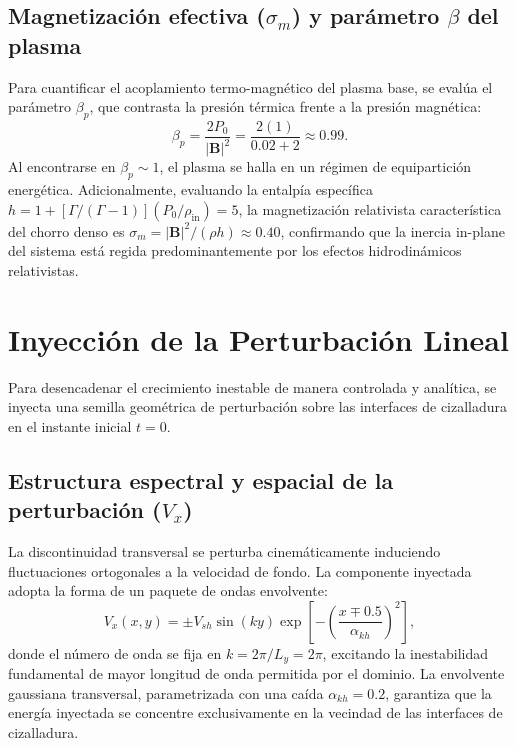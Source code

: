 \subsection{Magnetización efectiva ($\sigma_m$) y parámetro $\beta$ del plasma}

\primerparrafo Para cuantificar el acoplamiento termo-magnético del plasma base, se evalúa el parámetro $\beta_p$, que contrasta la presión térmica frente a la presión magnética:
\begin{equation}
    \beta_p = \frac{2 P_0}{|\mathbf{B}|^2} = \frac{2(1)}{0.02 + 2} \approx 0.99.
\end{equation}
Al encontrarse en $\beta_p \sim 1$, el plasma se halla en un régimen de equipartición energética. Adicionalmente, evaluando la entalpía específica $h = 1 + [\Gamma/(\Gamma-1)](P_0/\rho_{\text{in}}) = 5$, la magnetización relativista característica del chorro denso es $\sigma_m = |\mathbf{B}|^2 / (\rho h) \approx 0.40$, confirmando que la inercia in-plane del sistema está regida predominantemente por los efectos hidrodinámicos relativistas.

\section{Inyección de la Perturbación Lineal}

\primerparrafo Para desencadenar el crecimiento inestable de manera controlada y analítica, se inyecta una semilla geométrica de perturbación sobre las interfaces de cizalladura en el instante inicial $t=0$.

\subsection{Estructura espectral y espacial de la perturbación ($V_x$)}

\primerparrafo La discontinuidad transversal se perturba cinemáticamente induciendo fluctuaciones ortogonales a la velocidad de fondo. La componente inyectada adopta la forma de un paquete de ondas envolvente:
\begin{equation}
    V_x(x,y) = \pm V_{sh} \sin(k y) \exp\left[-\left(\frac{x \mp 0.5}{\alpha_{kh}}\right)^2\right],
\end{equation}
donde el número de onda se fija en $k = 2\pi/L_y = 2\pi$, excitando la inestabilidad fundamental de mayor longitud de onda permitida por el dominio. La envolvente gaussiana transversal, parametrizada con una caída $\alpha_{kh} = 0.2$, garantiza que la energía inyectada se concentre exclusivamente en la vecindad de las interfaces de cizalladura.

